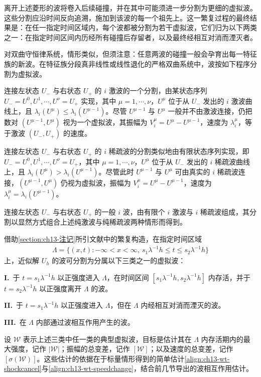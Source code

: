 \documentclass[../../main.tex]{subfiles}
\begin{document}
离开上述菱形的波将卷入后续碰撞，并在其中可能须进一步分割为更细的虚拟波。这些分割应沿时间反向追溯，施加到该波的每一个祖先上。这一繁复过程的最终结果是：在任一指定时间区域内，每个波都被分割为若干虚拟波，它们归为以下两类之一：在指定时间区间内历经所有碰撞后存留者，以及最终经相互对消而湮灭者。

对双曲守恒律系统，情形类似，但须注意：任意两波的碰撞一般会孕育出每一特征族的新波。在特征族分段真非线性或线性退化的严格双曲系统中，波按如下程序分割为虚拟波。

连接左状态 $U_-$ 与右状态 $U_+$ 的 $i$ 激波的一个分割，由某状态序列 $U_-=U^0,U^1,\cdots,U^\nu=U_+$ 实现，其中 $\mu=1,\cdots,\nu$，$U^\mu$ 位于从 $U_-$ 发出的 $i$ 激波曲线上，且 $\lambda_i(U^\mu)\leqslant\lambda_i(U^{\mu-1})$。尽管 $U^{\mu-1}$ 与 $U^\mu$ 一般并不由激波连接，仍把数对 $(U^{\mu-1},U^\mu)$ 视为一个虚拟波，其振幅为 $V_i^\mu=U^\mu-U^{\mu-1}$，速度为 $\lambda_i^\mu$，等于激波 $(U_-,U_+)$ 的速度。

连接左状态 $U_-$ 与右状态 $U_+$ 的 $i$ 稀疏波的分割类似地由有限状态序列实现，即 $U_-=U^0,U^1,\cdots,U^\nu=U_+$，其中 $\mu=1,\cdots,\nu$，$U^\mu$ 位于从 $U_-$ 发出的 $i$ 稀疏波曲线上，且 $\lambda_i(U^\mu)>\lambda_i(U^{\mu-1})$。尽管此时 $U^{\mu-1}$ 与 $U^\mu$ 可由真实的 $i$ 稀疏波连接，$(U^{\mu-1},U^\mu)$ 仍视为虚拟波，振幅为 $V_i^\mu=U^\mu-U^{\mu-1}$，速度为 $\lambda_i^\mu=\lambda_i(U^{\mu-1})$。

连接左状态 $U_-$ 与右状态 $U_+$ 的一般 $i$ 波，由有限个 $i$ 激波与 $i$ 稀疏波组成，其分割以显然方式组合上述纯激波与纯稀疏波两种情形而得到。

借助\cref{section:ch13-注记}所引文献中的繁复构造，在指定时间区域
\begin{align*}
\Lambda=\{(x,t):-\infty<x<\infty,\ s_1\lambda^{-1}h\leqslant t\leqslant s_2\lambda^{-1}h\}
\end{align*}
上，近似解 $U_h$ 的波可分割为分属以下三类之一的虚拟波：

\noindent\textbf{I.}\, 于 $t=s_1\lambda^{-1}h$ 以正强度进入 $\Lambda$，在时间区间 $[s_1\lambda^{-1}h,s_2\lambda^{-1}h]$ 内存活，并于 $t=s_2\lambda^{-1}h$ 以正强度离开 $\Lambda$ 的波。

\noindent\textbf{II.}\, 于 $t=s_1\lambda^{-1}h$ 以正强度进入 $\Lambda$，但在 $\Lambda$ 内经相互对消而湮灭的波。

\noindent\textbf{III.}\, 在 $\Lambda$ 内部通过波相互作用产生的波。

设 $\mathscr{W}$ 表示上述三类中任一类的典型虚拟波，目标是估计其在 $\Lambda$ 内存活期内的最大强度，记作 $|\mathscr{W}|$；振幅的总变差，记作 $[\mathscr{W}]$；以及速度的总变差，记作 $[\sigma(\mathscr{W})]$。这些估计的依据在于标量情形得到的简单估计\eqref{align:ch13-wt-shockcancel}与\eqref{align:ch13-wt-speedchange}，结合前几节导出的波相互作用估计。
\end{document}
